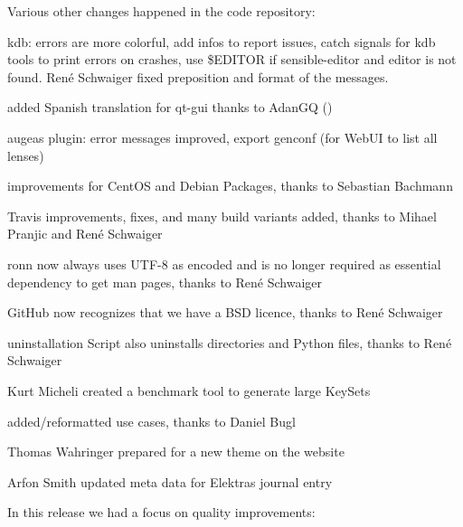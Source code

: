 Various other changes happened in the code repository\+:


\begin{DoxyItemize}
\item kdb\+: errors are more colorful, add infos to report issues, catch signals for {\ttfamily kdb} tools to print errors on crashes, use {\ttfamily \$\+E\+D\+I\+T\+OR} if {\ttfamily sensible-\/editor} and {\ttfamily editor} is not found. René Schwaiger fixed preposition and format of the messages.
\item added Spanish translation for qt-\/gui thanks to Adan\+GQ ()
\item augeas plugin\+: error messages improved, export genconf (for Web\+UI to list all lenses)
\item improvements for Cent\+OS and Debian Packages, thanks to Sebastian Bachmann
\item Travis improvements, fixes, and many build variants added, thanks to Mihael Pranjic and René Schwaiger
\item {\ttfamily ronn} now always uses U\+T\+F-\/8 as encoded and is no longer required as essential dependency to get man pages, thanks to René Schwaiger
\item Git\+Hub now recognizes that we have a B\+SD licence, thanks to René Schwaiger
\item uninstallation Script also uninstalls directories and Python files, thanks to René Schwaiger
\item Kurt Micheli created a benchmark tool to generate large Key\+Sets
\item added/reformatted use cases, thanks to Daniel Bugl
\item Thomas Wahringer prepared for a new theme on the website
\item Arfon Smith updated meta data for Elektra\textquotesingle{}s journal entry
\end{DoxyItemize}

In this release we had a focus on quality improvements\+:


